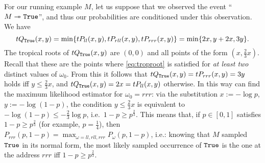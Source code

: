 \begin{example}
For our running example $M$, 
let us suppose that we observed the event ``$M\twoheadrightarrow\mathtt{True}$'', and thus our probabilities are conditioned under this observation. We have
\[\trop Q_{\true}(x,y)=\min\set{\trop P_{ll}(x,y),\trop  P_{rll}(x,y),\trop P_{rrr}(x,y)}=\min
\set{2x,y+2x,3y}.\]
The tropical roots of $\trop Q_{\true}(x,y)$ are $(0,0)$ and all points of the form $(x,\frac{2}{3}x)$. Recall that these are the points where \autoref{eq:troproot} is satisfied for \emph{at least two} distinct values of $\omega_{0}$. From this it follows that $\trop Q_{\true} (x,y)=\trop P_{rrr}(x,y)=3y$ holds iff $y\leq \frac{2}{3}x$, and  $\trop Q_{\true}(x,y)=2x=\trop P_{ll}(x,y)$ otherwise.
In this way can find the maximum likelihood estimator for $\omega_0=rrr$:
via the substitution $x:=-\log p$, $y:=-\log (1-p)$, the condition $y\leq \frac{2}{3}x$ is equivalent to $-\log (1-p)\leq -\frac{2}{3}\log p$, i.e.\ $1-p\geq p^{\frac{2}{3}}$.
This means that, if $p\in[0,1]$ satisfies $1-p\geq p^{\frac{2}{3}}$ (for example, $p=\frac{1}{4}$), then $P_{rrr}(p,1-p) = \max_{\omega=ll, rll, rrr} P_{\omega}(p,1-p)$, i.e.: knowing that $M$ sampled $\mathtt{True}$ in its normal form, the most likely sampled occurrence of $\mathtt{True}$ is the one at the address $rrr$ iff $1-p\geq p^{\frac{2}{3}}$.
\end{example}

